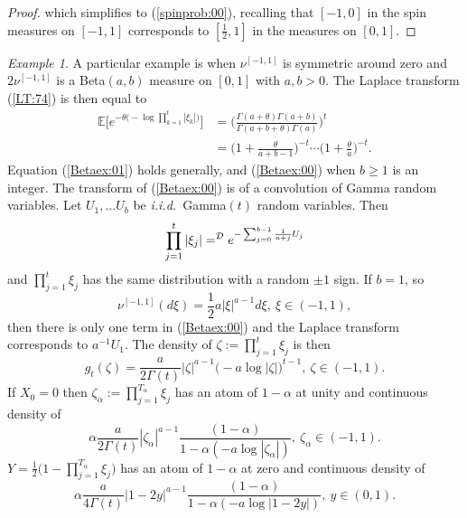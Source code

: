 \documentclass[preprint,11pt]{elsarticle}
\theoremstyle{remark}
\newtheorem{Example}{Example}
\def\spin{{[-1,1]}}
\def\iid{\emph{i.i.d.}~}
\begin{document}
{\begin{proof}
which simplifies to (\ref{spinprob:00}), recalling that $[-1,0]$ in the spin measures on $\spin$ corresponds to $[\frac{1}{2},1]$ in the measures on $[0,1]$.
\end{proof}
\begin{Example}\label{Betaexample:00}
A particular example is when $\nu^\spin$ is symmetric around zero and $2\nu^\spin$ is a Beta$(a,b)$ measure on $[0,1]$ with $a,b>0$. The Laplace transform (\ref{LT:74}) is then equal to
\begin{align}
\mathbb{E}\Big [e^{-\theta \big (-\log \prod_{k=1}^t|\xi_k|\big )}\Big ]
&= \Bigg (\frac{\Gamma(a+\theta)\Gamma(a+b)}{\Gamma(a+b+\theta)\Gamma(a)}\Bigg )^t\label{Betaex:01}\\
&= \Big ( 1 + \frac{\theta}{a+b-1}\big )^{-t} \cdots \Big (1 + \frac{\theta}{a} \Big )^{-t}.
\label{Betaex:00}
\end{align}
Equation (\ref{Betaex:01}) holds generally, and (\ref{Betaex:00}) when $b\geq 1$ is an integer.
The transform of (\ref{Betaex:00}) is of a convolution of Gamma random variables.
Let $U_1,\ldots U_b$ be \iid  Gamma$(t)$ random variables. Then
\begin{equation*}
\prod_{j=1}^t|\xi_j| =^{\cal D}e^{- \sum_{j=0}^{b-1}\frac{1}{a+j}U_j}
\label{prodgamma:02}
\end{equation*}
and $\prod_{j=1}^t\xi_j$ has the same distribution with a random $\pm 1$ sign.
%
If $b=1$, so
\[
\nu^\spin(d\xi) = \frac{1}{2}a|\xi|^{a-1}d\xi, \ \xi\in (-1,1),
\]
then there is only one term in (\ref{Betaex:00}) and the Laplace transform corresponds 
to $a^{-1}U_1$. The density of $\zeta:=\prod_{j=1}^{t}\xi_j$ is then 
\begin{equation*}
g_t(\zeta) = \frac{a}{2\Gamma (t)}|\zeta|^{a-1}\Big (-a \log |\zeta|\Big )^{t-1},\ \zeta \in (-1,1).
\label{prodgamma:00}
\end{equation*}
If $X_0=0$ then $\zeta_\alpha := \prod_{j=1}^{T_\alpha}\xi_j$ has an atom of $1-\alpha$ at unity and 
continuous density of
\begin{equation*}
\alpha\frac{a}{2\Gamma (t)}|\zeta_\alpha|^{a-1}\frac{(1-\alpha)}{1 - \alpha(-a\log|\zeta_\alpha|)},
\ \zeta_\alpha \in (-1,1).
\label{prodgamma:03}
\end{equation*}
$Y = \frac{1}{2}\Big (1 - \prod_{j=1}^{T_\alpha}\xi_j\Big )$ has an atom of $1-\alpha$ at zero and continuous density of
\begin{equation*}
\alpha\frac{a}{4\Gamma (t)}|1-2y|^{a-1}\frac{(1-\alpha)}{1 - \alpha(-a\log|1-2y|)},
\ y \in (0,1).
\label{prodgamma:04}
\end{equation*}

\end{Example}}
\end{document}
